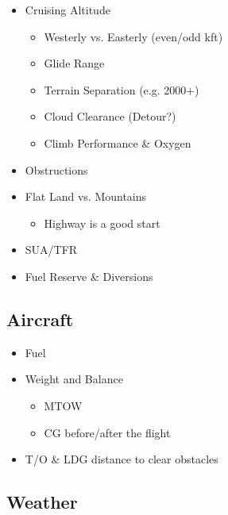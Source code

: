 \documentclass[10pt]{article}
\begin{document}
\begin{multicols*}{2}
\begin{itemize}
\item Cruising Altitude

\begin{itemize}
\item Westerly vs. Easterly (even/odd kft)

\item Glide Range

\item Terrain Separation (e.g. 2000+)

\item Cloud Clearance (Detour?)

\item Climb Performance \& Oxygen
\end{itemize}

\item Obstructions

\item Flat Land vs. Mountains

\begin{itemize}
\item Highway is a good start
\end{itemize}

\item SUA/TFR

\item Fuel Reserve \& Diversions
\end{itemize}


\subsection{Aircraft%
  \label{aircraft}%
}

\begin{itemize}
\item Fuel

\item Weight and Balance

\begin{itemize}
\item MTOW

\item CG before/after the flight
\end{itemize}

\item T/O \& LDG distance to clear obstacles
\end{itemize}


\subsection{Weather%
  \label{weather}%
}


\end{multicols*}
\end{document}
